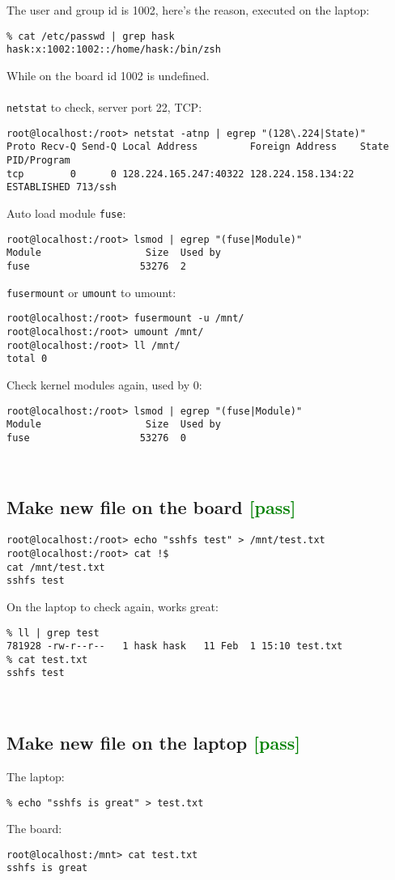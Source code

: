 \documentclass[a4paper]{report}
\begin{document}
\begin{enumerate}
\begin{lstlisting}
\end{lstlisting}
The user and group id is 1002, here's the reason, executed on the laptop:
\begin{lstlisting}
% cat /etc/passwd | grep hask        
hask:x:1002:1002::/home/hask:/bin/zsh
\end{lstlisting}
While on the board id 1002 is undefined.\\\\
{\tt netstat} to check, server port 22, TCP:
\begin{lstlisting}
root@localhost:/root> netstat -atnp | egrep "(128\.224|State)"
Proto Recv-Q Send-Q Local Address         Foreign Address    State       PID/Program
tcp        0      0 128.224.165.247:40322 128.224.158.134:22 ESTABLISHED 713/ssh
\end{lstlisting}
Auto load module {\tt fuse}:
\begin{lstlisting}
root@localhost:/root> lsmod | egrep "(fuse|Module)"
Module                  Size  Used by
fuse                   53276  2 
\end{lstlisting}
{\tt fusermount} or {\tt umount} to umount:
\begin{lstlisting}
root@localhost:/root> fusermount -u /mnt/
root@localhost:/root> umount /mnt/
root@localhost:/root> ll /mnt/
total 0
\end{lstlisting}
Check kernel modules again, used by 0:
\begin{lstlisting}
root@localhost:/root> lsmod | egrep "(fuse|Module)"
Module                  Size  Used by
fuse                   53276  0 
\end{lstlisting}\null\\
\subsection{Make new file on the board \textcolor{green}{[pass]}}
\begin{lstlisting}
root@localhost:/root> echo "sshfs test" > /mnt/test.txt
root@localhost:/root> cat !$
cat /mnt/test.txt
sshfs test
\end{lstlisting}
On the laptop to check again, works great:
\begin{lstlisting}
% ll | grep test                       
781928 -rw-r--r--   1 hask hask   11 Feb  1 15:10 test.txt
% cat test.txt                        
sshfs test
\end{lstlisting}\null\\
\subsection{Make new file on the laptop \textcolor{green}{[pass]}}
The laptop:
\begin{lstlisting}
% echo "sshfs is great" > test.txt
\end{lstlisting}
The board:
\begin{lstlisting}
root@localhost:/mnt> cat test.txt 
sshfs is great
\end{lstlisting}\null\\

\end{enumerate}
\end{document}
